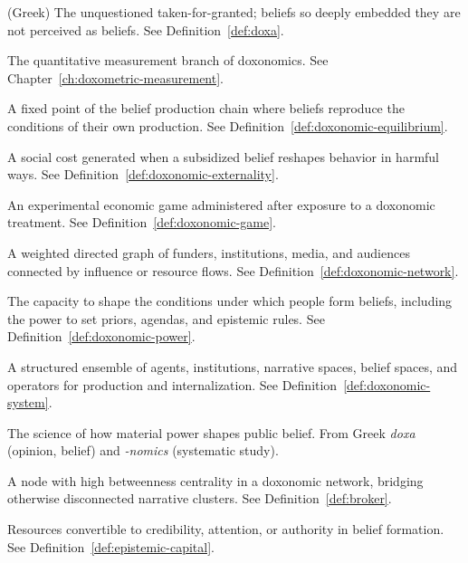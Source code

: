 \begin{description}[style=nextline, leftmargin=3cm]
\item[Doxa] (Greek) The unquestioned taken-for-granted; beliefs so deeply embedded they are not perceived as beliefs. See Definition~\ref{def:doxa}.

\item[Doxametry] The quantitative measurement branch of doxonomics. See Chapter~\ref{ch:doxometric-measurement}.

\item[Doxonomic equilibrium] A fixed point of the belief production chain where beliefs reproduce the conditions of their own production. See Definition~\ref{def:doxonomic-equilibrium}.

\item[Doxonomic externality] A social cost generated when a subsidized belief reshapes behavior in harmful ways. See Definition~\ref{def:doxonomic-externality}.

\item[Doxonomic game] An experimental economic game administered after exposure to a doxonomic treatment. See Definition~\ref{def:doxonomic-game}.

\item[Doxonomic network] A weighted directed graph of funders, institutions, media, and audiences connected by influence or resource flows. See Definition~\ref{def:doxonomic-network}.

\item[Doxonomic power] The capacity to shape the conditions under which people form beliefs, including the power to set priors, agendas, and epistemic rules. See Definition~\ref{def:doxonomic-power}.

\item[Doxonomic system] A structured ensemble of agents, institutions, narrative spaces, belief spaces, and operators for production and internalization. See Definition~\ref{def:doxonomic-system}.

\item[Doxonomics] The science of how material power shapes public belief. From Greek \textit{doxa} (opinion, belief) and \textit{-nomics} (systematic study).

\item[Epistemic broker] A node with high betweenness centrality in a doxonomic network, bridging otherwise disconnected narrative clusters. See Definition~\ref{def:broker}.

\item[Epistemic capital] Resources convertible to credibility, attention, or authority in belief formation. See Definition~\ref{def:epistemic-capital}.


\end{description}
